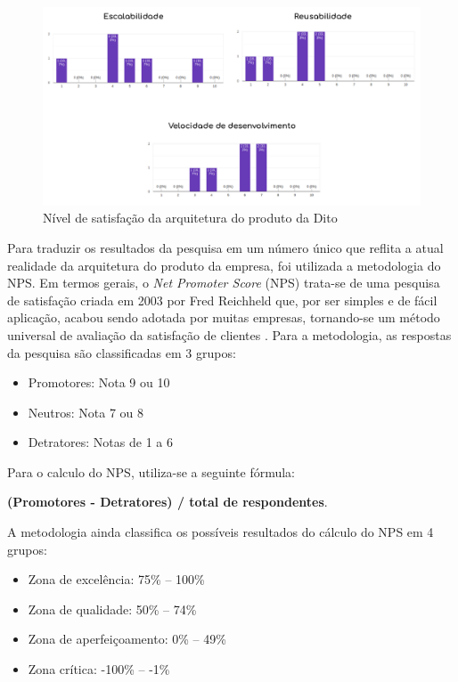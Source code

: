 \begin{figure}
  \begin{center}
	  \includegraphics[width=\linewidth]{./04-figuras/08_avaliacao_resultados/product-metrics.png}
	\end{center}
  \caption{Nível de satisfação da arquitetura do produto da Dito}
  \label{fig:productMetrics}
\end{figure}

Para traduzir os resultados da pesquisa em um número único que reflita a atual realidade da arquitetura do produto da empresa, foi utilizada a metodologia do NPS. Em termos gerais, o \textit{Net Promoter Score} (NPS) trata-se de uma pesquisa de satisfação criada em 2003 por Fred Reichheld que, por ser simples e de fácil aplicação, acabou sendo adotada por muitas empresas, tornando-se um método universal de avaliação da satisfação de clientes \cite{nps}. Para a metodologia, as respostas da pesquisa são classificadas em 3 grupos:

\begin{itemize}
  \item Promotores: Nota 9 ou 10
  \item Neutros: Nota 7 ou 8
  \item Detratores: Notas de 1 a 6
\end{itemize}

Para o calculo do NPS, utiliza-se a seguinte fórmula:
\begin{center}
  \textbf{(Promotores - Detratores) / total de respondentes}.    
\end{center}{}

A metodologia ainda classifica os possíveis resultados do cálculo do NPS em 4 grupos:

\begin{itemize}
  \item Zona de excelência: 75\% -- 100\%
  \item Zona de qualidade: 50\% -- 74\%
  \item Zona de aperfeiçoamento: 0\% -- 49\%
  \item Zona crítica: -100\% -- -1\%
\end{itemize}


